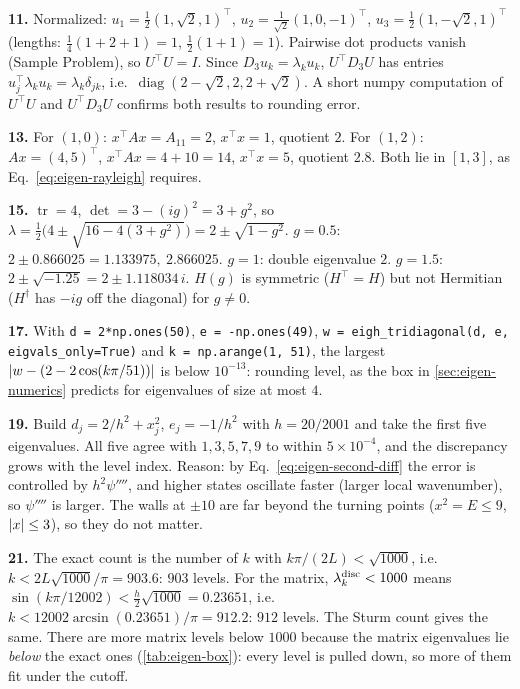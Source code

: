 \textbf{11.} Normalized: $u_1=\tfrac12(1,\sqrt2,1)^\top$, $u_2=\tfrac1{\sqrt2}(1,0,-1)^\top$, $u_3=\tfrac12(1,-\sqrt2,1)^\top$ (lengths: $\tfrac14(1+2+1)=1$, $\tfrac12(1+1)=1$). Pairwise dot products vanish (Sample Problem), so $U^\top U=I$. Since $D_3u_k=\lambda_ku_k$, $U^\top D_3U$ has entries $u_j^\top\lambda_ku_k=\lambda_k\delta_{jk}$, i.e.\ $\operatorname{diag}(2-\sqrt2,2,2+\sqrt2)$. A short numpy computation of $U^\top U$ and $U^\top D_3U$ confirms both results to rounding error.

\textbf{13.} For $(1,0)$: $x^\top Ax=A_{11}=2$, $x^\top x=1$, quotient $2$. For $(1,2)$: $Ax=(4,5)^\top$, $x^\top Ax=4+10=14$, $x^\top x=5$, quotient $2.8$. Both lie in $[1,3]$, as Eq.~\eqref{eq:eigen-rayleigh} requires.

\textbf{15.} $\operatorname{tr}=4$, $\det=3-(ig)^2=3+g^2$, so $\lambda=\tfrac12\bigl(4\pm\sqrt{16-4(3+g^2)}\bigr)=2\pm\sqrt{1-g^2}$. $g=0.5$: $2\pm0.866025=1.133975,\ 2.866025$. $g=1$: double eigenvalue $2$. $g=1.5$: $2\pm\sqrt{-1.25}=2\pm1.118034\,i$. $H(g)$ is symmetric ($H^\top=H$) but not Hermitian ($H^\dagger$ has $-ig$ off the diagonal) for $g\ne0$.

\textbf{17.} With \texttt{d = 2*np.ones(50)}, \texttt{e = -np.ones(49)}, \texttt{w = eigh\_tridiagonal(d, e, eigvals\_only=True)} and \texttt{k = np.arange(1, 51)}, the largest $\left\lvert w-(2-2\cos(k\pi/51))\right\rvert$ is below $10^{-13}$: rounding level, as the box in \cref{sec:eigen-numerics} predicts for eigenvalues of size at most $4$.

\textbf{19.} Build $d_j=2/h^2+x_j^2$, $e_j=-1/h^2$ with $h=20/2001$ and take the first five eigenvalues. All five agree with $1,3,5,7,9$ to within $5\times10^{-4}$, and the discrepancy grows with the level index. Reason: by Eq.~\eqref{eq:eigen-second-diff} the error is controlled by $h^2\psi''''$, and higher states oscillate faster (larger local wavenumber), so $\psi''''$ is larger. The walls at $\pm10$ are far beyond the turning points ($x^2=E\le9$, $\left\lvert x\right\rvert\le3$), so they do not matter.

\textbf{21.} The exact count is the number of $k$ with $k\pi/(2L)<\sqrt{1000}$, i.e.\ $k<2L\sqrt{1000}/\pi=903.6$: $903$ levels. For the matrix, $\lambda_k^{\rm disc}<1000$ means $\sin(k\pi/12002)<\tfrac h2\sqrt{1000}=0.23651$, i.e.\ $k<12002\arcsin(0.23651)/\pi=912.2$: $912$ levels. The Sturm count gives the same. There are more matrix levels below $1000$ because the matrix eigenvalues lie \emph{below} the exact ones (\cref{tab:eigen-box}): every level is pulled down, so more of them fit under the cutoff.

